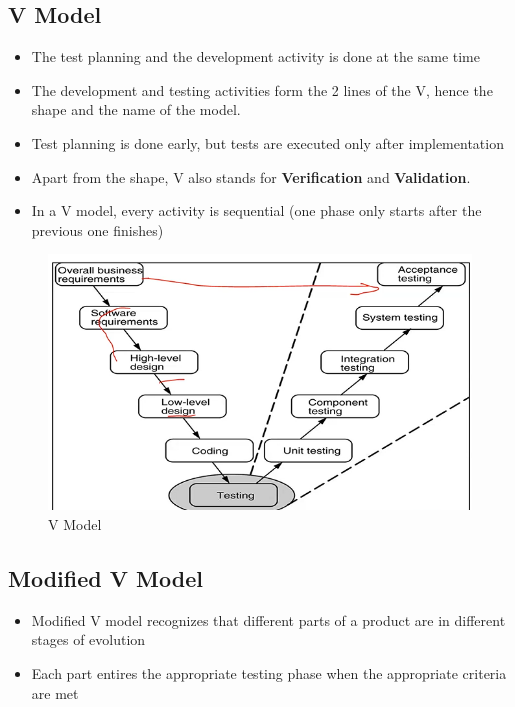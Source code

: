 \documentclass{article}
\begin{document}
\subsection{V Model}
\begin{itemize}
    \item The test planning and the development activity is done at the same time
    
    \item The development and testing activities form the 2 lines of the V, hence the shape and the name of the model. 
    
    \item Test planning is done early, but tests are executed only after implementation
    
    \item Apart from the shape, V also stands for \textbf{Verification} and \textbf{Validation}. 
    
    \item In a V model, every activity is sequential (one phase only starts after the previous one finishes)
\end{itemize}
\begin{figure}
    \centering
    \includegraphics[scale=0.5]{p2.png}
    \caption{V Model}
    \label{fig:my_label_1}
\end{figure}

\subsection{Modified V Model}
\begin{itemize}
    \item Modified V model recognizes that different parts of a product are in different stages of evolution
    
    \item Each part entires the appropriate testing phase when the appropriate criteria are met
\end{itemize}
\end{document}
